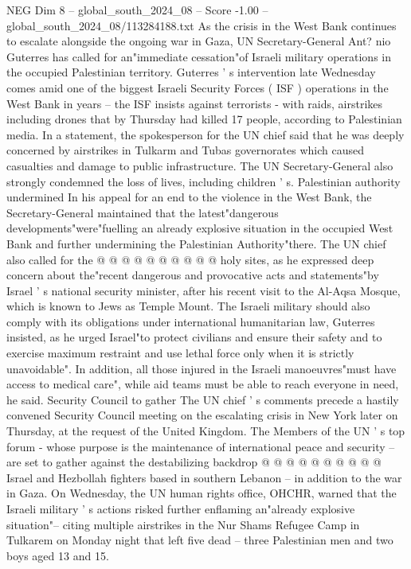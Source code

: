 \begin{textsample}{NEG Dim 8 – global\_south\_2024\_08 – Score -1.00 – global\_south\_2024\_08/113284188.txt}  \label{ex:f8_neg_289}
As the crisis in the West Bank continues to escalate alongside the ongoing war in Gaza, UN Secretary-General Ant? nio Guterres has called for an"immediate cessation"of Israeli military operations in the occupied Palestinian territory.
Guterres ' s intervention late Wednesday comes amid one of the biggest Israeli Security Forces ( ISF ) operations in the West Bank in years -- the ISF insists against terrorists - with raids, airstrikes including drones that by Thursday had killed 17 people, according to Palestinian media.
In a statement, the spokesperson for the UN chief said that he was deeply concerned by airstrikes in Tulkarm and Tubas governorates which caused casualties and damage to public infrastructure.
The UN Secretary-General also strongly condemned the loss of lives, including children ' s.
Palestinian authority undermined In his appeal for an end to the violence in the West Bank, the Secretary-General maintained that the latest"dangerous developments"were"fuelling an already explosive situation in the occupied West Bank and further undermining the Palestinian Authority"there.
The UN chief also called for the @ @ @ @ @ @ @ @ @ @ holy sites, as he expressed deep concern about the"recent dangerous and provocative acts and statements"by Israel ' s national security minister, after his recent visit to the Al-Aqsa Mosque, which is known to Jews as Temple Mount.
The Israeli military should also comply with its obligations under international humanitarian law, Guterres insisted, as he urged Israel"to protect civilians and ensure their safety and to exercise maximum restraint and use lethal force only when it is strictly unavoidable".
In addition, all those injured in the Israeli manoeuvres"must have access to medical care", while aid teams must be able to reach everyone in need, he said.
Security Council to gather The UN chief ' s comments precede a hastily convened Security Council meeting on the escalating crisis in New York later on Thursday, at the request of the United Kingdom.
The Members of the UN ' s top forum - whose purpose is the maintenance of international peace and security -- are set to gather against the destabilizing backdrop @ @ @ @ @ @ @ @ @ @ Israel and Hezbollah fighters based in southern Lebanon -- in addition to the war in Gaza.
On Wednesday, the UN human rights office, OHCHR, warned that the Israeli military ' s actions risked further enflaming an"already explosive situation"-- citing multiple airstrikes in the Nur Shams Refugee Camp in Tulkarem on Monday night that left five dead -- three Palestinian men and two boys aged 13 and 15.

\end{textsample}
